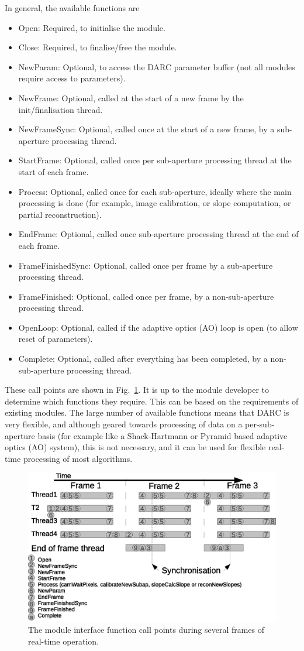 \documentclass[a4,10pt]{article}
\newcommand{\ao}{adaptive optics (AO)\renewcommand{\ao}{AO\xspace}\xspace}
\begin{document}
In general, the available functions are
\begin{itemize}
\item Open:  Required, to initialise the module.
\item Close: Required, to finalise/free the module.
\item NewParam: Optional, to access the DARC parameter buffer (not all
  modules require access to parameters).
\item NewFrame: Optional, called at the start of a new frame by the
  init/finalisation thread.
\item NewFrameSync: Optional, called once at the start of a new frame,
  by a sub-aperture processing thread.
\item StartFrame:  Optional, called once per sub-aperture processing
  thread at the start of each frame.
\item Process: Optional, called once for each sub-aperture,
  ideally where the main processing is done (for example, image
  calibration, or slope computation, or partial reconstruction).
\item EndFrame: Optional, called once sub-aperture processing thread
  at the end of each frame.
\item FrameFinishedSync: Optional, called once per frame by a
  sub-aperture processing thread.
\item FrameFinished: Optional, called once per frame, by a
  non-sub-aperture processing thread.
\item OpenLoop: Optional, called if the \ao loop is open (to allow
  reset of parameters).
\item Complete: Optional, called after everything has been completed,
  by a non-sub-aperture processing thread.
\end{itemize}

These call points are shown in Fig.~\ref{fig:hooks}.  It is up to the
module developer to determine which functions they require.  This can
be based on the requirements of existing modules.  The large number of
available functions means that DARC is very flexible, and although
geared towards processing of data on a per-sub-aperture basis (for
example like a Shack-Hartmann or Pyramid based \ao system), this is
not necessary, and it can be used for flexible real-time processing of
most algorithms.

\begin{figure}
\includegraphics[width=0.5\linewidth]{hooks.eps}
\caption{The module interface function call points during several
  frames of real-time operation.}
\label{fig:hooks}
\end{figure}
\end{document}
